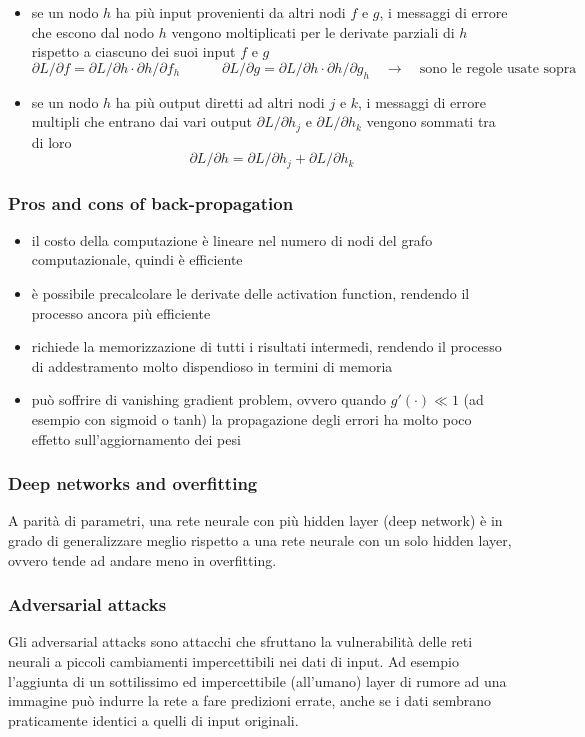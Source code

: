 \begin{itemize}
	\item se un nodo \(h\) ha più input provenienti da altri nodi \(f\) e \(g\), i messaggi di errore che escono dal nodo \(h\)
	vengono moltiplicati per le derivate parziali di \(h\) rispetto a ciascuno dei suoi input \(f\) e \(g\)
	\[\partial L / \partial f = \partial L / \partial h \cdot \partial h / \partial f_h \qquad\quad \partial L / \partial g = \partial L / \partial h \cdot \partial h / \partial g_h \quad \rightarrow \quad \text{sono le regole usate sopra}\]
	\item se un nodo \(h\) ha più output diretti ad altri nodi \(j\) e \(k\), i messaggi di errore multipli che entrano dai vari
	output \(\partial L / \partial h_j\) e \(\partial L / \partial h_k\) vengono sommati tra di loro
	\[\partial L / \partial h = \partial L / \partial h_j + \partial L / \partial h_k\]
\end{itemize}

\subsubsection*{Pros and cons of back-propagation}
\begin{itemize}
	\item il costo della computazione è lineare nel numero di nodi del grafo computazionale, quindi è efficiente
	\item è possibile precalcolare le derivate delle activation function, rendendo il processo ancora più efficiente
	\item richiede la memorizzazione di tutti i risultati intermedi, rendendo il processo di addestramento molto dispendioso
	in termini di memoria
	\item può soffrire di vanishing gradient problem, ovvero quando \(g'(\cdot) \ll 1\) (ad esempio con sigmoid o tanh) la
	propagazione degli errori ha molto poco effetto sull'aggiornamento dei pesi
\end{itemize}

\subsubsection*{Deep networks and overfitting}
A parità di parametri, una rete neurale con più hidden layer (deep network) è in grado di generalizzare meglio rispetto a una
rete neurale con un solo hidden layer, ovvero tende ad andare meno in overfitting.

\subsubsection*{Adversarial attacks}
Gli adversarial attacks sono attacchi che sfruttano la vulnerabilità delle reti neurali a piccoli cambiamenti impercettibili
nei dati di input. Ad esempio l'aggiunta di un sottilissimo ed impercettibile (all'umano) layer di rumore ad una immagine può
indurre la rete a fare predizioni errate, anche se i dati sembrano praticamente identici a quelli di input originali. 

